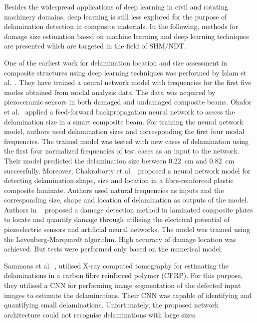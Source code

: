 \documentclass[preprint,9pt]{elsarticle}
\begin{document}

Besides the widespread applications of deep learning in civil and rotating machinery domains, deep learning is still less explored for the purpose of delamination detection in composite materials.
In the following, methods for damage size estimation based on machine learning and deep learning techniques are presented which are targeted in the field of SHM/NDT.
  	
One of the earliest work for delamination location and size assessment in composite structures using deep learning techniques was performed by Islam et al.~\cite{islam1994damage}. 
They have trained a neural network model with frequencies for the first five modes obtained from modal analysis data. 
The data was acquired by piezoceramic sensors in both damaged and undamaged composite beams.
Okafor et al.~\cite{okafor1996delamination} applied a feed-forward backpropagation neural network to assess the delamination size in a smart composite beam. 
For training the neural network model, authors used delamination sizes and corresponding the first four modal frequencies. 
The trained model was tested with new cases of delamination using the first four normalized frequencies of test cases as an input to the network. 
Their model predicted the delamination size between 0.22~cm and 0.82~cm successfully.
Moreover, Chakraborty et al.~\cite{chakraborty2005artificial} proposed a neural network model for detecting delamination shape, size and location in a fibre-reinforced plastic composite laminate.
Authors used natural frequencies as inputs and the corresponding size, shape and location of delamination as outputs of the model. 
Authors in ~\cite{roseiro2005neural}  proposed a damage detection method in laminated composite plates to locate and quantify damage through utilising the electrical potential of piezoelectric sensors and artificial neural networks. 
The model was trained using the Levenberg-Marquardt algorithm. High accuracy of damage location was achieved.
But tests were performed only based on the numerical model.  

Sammons et al.~\cite{sammons2016segmenting}, utilised X-ray computed tomography for estimating the delaminations in a carbon fibre reinforced polymer (CFRP). 
For this purpose, they utilised a CNN for performing image segmentation of the defected input images to estimate the delaminations. 
Their CNN was capable of identifying and quantifying small delaminations. 
Unfortunately, the proposed network architecture could not recognise delaminations with large sizes.
 
\end{document}
